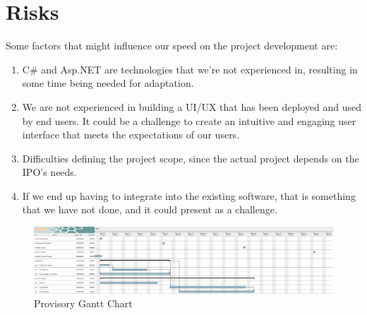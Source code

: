 \documentclass[a4paper,11pt]{article}
\begin{document}
\section{Risks}
Some factors that might influence our speed on the project development are:
\begin{enumerate}
	\item C\# \cite{csharp} and Asp.NET are technologies that we’re not experienced in, resulting in some time being needed for adaptation.

	\item We are not experienced in building a UI/UX that has been deployed and used by end users. It could be a challenge to create an intuitive and engaging user interface that meets the expectations of our users.

	\item Difficulties defining the project scope, since the actual project depends on the IPO's needs.

	\item If we end up having to integrate into the existing software, that is something that we have not done, and it could present as a challenge.
\end{enumerate}

\begin{figure}
\centering
\includegraphics[width=\textwidth,height=\textheight,keepaspectratio]{gantt.png}
\caption{Provisory Gantt Chart}
\end{figure}

\printbibliography[heading=bibintoc]
\end{document}
